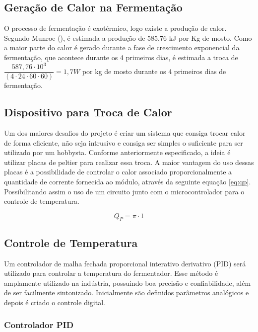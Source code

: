 \subsection{Geração de Calor na Fermentação}

O processo de fermentação é exotérmico, logo existe a produção de calor. Segundo Munroe (), é estimada a produção de 585,76 kJ por Kg de mosto. Como a maior parte do calor é gerado durante a fase de crescimento exponencial da fermentação, que acontece durante os 4 primeiros dias, é estimada a troca de \(\dfrac{587,76 \cdot 10^3}{(4 \cdot 24 \cdot 60 \cdot 60)} = 1,7 W\) por kg de mosto durante os 4 primeiros dias de fermentação.   

\subsection{Dispositivo para Troca de Calor}

Um dos maiores desafios do projeto é criar um sistema que consiga trocar calor de forma eficiente, não seja intrusivo e consiga ser simples o suficiente para ser utilizado por um hobbysta. Conforme anteriormente especificado, a ideia é utilizar placas de peltier para realizar essa troca. A maior vantagem do uso dessas placas é a possibilidade de controlar o calor associado proporcionalmente a quantidade de corrente fornecida ao módulo, através da seguinte equação \ref{eq:qp}. Possibilitando assim o uso de um circuito junto com o microcontrolador para o controle de temperatura.

\begin{equation}
    Q_P = \pi \cdot 1
    \label{eq:qp}
\end{equation}


\subsection{Controle de Temperatura}

Um controlador de malha fechada proporcional interativo derivativo (PID) será utilizado para controlar a temperatura do fermentador. Esse método é amplamente utilizado na indústria, possuindo boa precisão e confiabilidade, além de ser facilmente sintonizado. Inicialmente são definidos parâmetros analógicos e depois é criado o controle digital.

\subsubsection{Controlador PID}

